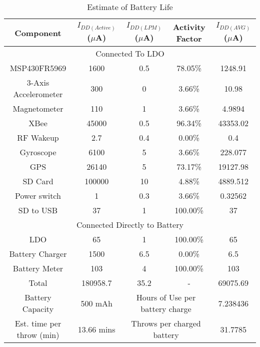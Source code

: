 \begin{table}[H]
  \centering
  \caption{Estimate of Battery Life}
    \begin{tabular}{|c|c|c|c|c|}
     \hline
    Component & $I_{DD(Active)}$ ($\mu$A) & $I_{DD(LPM)}$ ($\mu$A) & Activity Factor & $I_{DD(AVG)}$ ($\mu$A) \\
     \hline \hline
    \multicolumn{5}{|c|}{Connected To LDO} \\ \hline
    MSP430FR5969 & 1600  & 0.5   & 78.05\% & 1248.91 \\ \hline
    3-Axis Accelerometer & 300   & 0     & 3.66\% & 10.98 \\ \hline
    Magnetometer & 110   & 1     & 3.66\% & 4.9894 \\ \hline
    XBee  & 45000 & 0.5   & 96.34\% & 43353.02 \\ \hline
    RF Wakeup & 2.7   & 0.4   & 0.00\% & 0.4 \\ \hline
    Gyroscope & 6100  & 5     & 3.66\% & 228.077 \\ \hline
    GPS   & 26140 & 5     & 73.17\% & 19127.98 \\ \hline
    SD Card & 100000 & 10    & 4.88\% & 4889.512 \\ \hline
    Power switch & 1     & 0.3   & 3.66\% & 0.32562 \\ \hline
    SD to USB & 37    & 1     & 100.00\% & 37 \\ \hline
    \multicolumn{5}{|c|}{Connected Directly to Battery} \\ \hline
    LDO   & 65    & 1     & 100.00\% & 65 \\ \hline
    Battery Charger & 1500  & 6.5   & 0.00\% & 6.5 \\ \hline
    Battery Meter & 103   & 4     & 100.00\% & 103 \\ \hline \hline
    Total & 180958.7 & 35.2  &    -   & 69075.69 \\ \hline \hline
    Battery Capacity &   500 mAh    &      \multicolumn{2}{c|}{Hours of Use per battery charge} & 7.238436 \\ \hline
    Est. time per throw (min) & 13.66 mins  &    \multicolumn{2}{c|}{Throws per charged battery} & 31.7785 \\ \hline
    
    \end{tabular}%
  \label{tab:batLife}%
\end{table}%


